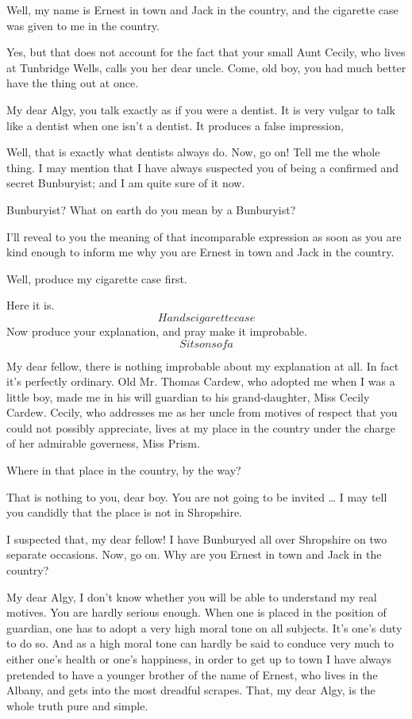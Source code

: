 \documentclass{book}
\begin{document}
\1  Well, my name is Ernest in town and Jack in the country, and
the cigarette case was given to me in the country.

\2  Yes, but that does not account for the fact that your
small Aunt Cecily, who lives at Tunbridge Wells, calls you her dear
uncle.  Come, old boy, you had much better have the thing out at
once.

\1  My dear Algy, you talk exactly as if you were a dentist.  It
is very vulgar to talk like a dentist when one isn't a dentist.  It
produces a false impression,

\2  Well, that is exactly what dentists always do.  Now, go
on!  Tell me the whole thing.  I may mention that I have always
suspected you of being a confirmed and secret Bunburyist; and I am
quite sure of it now.

\1  Bunburyist? What on earth do you mean by a Bunburyist?

\2  I'll reveal to you the meaning of that incomparable
expression as soon as you are kind enough to inform me why you are
Ernest in town and Jack in the country.

\1  Well, produce my cigarette case first.

\2  Here it is.  \[Hands cigarette case\]  Now produce your
explanation, and pray make it improbable.  \[Sits on sofa\]

\1  My dear fellow, there is nothing improbable about my
explanation at all.  In fact it's perfectly ordinary.  Old Mr.
Thomas Cardew, who adopted me when I was a little boy, made me in
his will guardian to his grand-daughter, Miss Cecily Cardew.
Cecily, who addresses me as her uncle from motives of respect that
you could not possibly appreciate, lives at my place in the country
under the charge of her admirable governess, Miss Prism.

\2  Where in that place in the country, by the way?

\1  That is nothing to you, dear boy.  You are not going to be
invited \ldots{} I may tell you candidly that the place is not in
Shropshire.

\2  I suspected that, my dear fellow!  I have Bunburyed all
over Shropshire on two separate occasions.  Now, go on.  Why are
you Ernest in town and Jack in the country?

\1  My dear Algy, I don't know whether you will be able to
understand my real motives.  You are hardly serious enough.  When
one is placed in the position of guardian, one has to adopt a very
high moral tone on all subjects.  It's one's duty to do so.  And as
a high moral tone can hardly be said to conduce very much to either
one's health or one's happiness, in order to get up to town I have
always pretended to have a younger brother of the name of Ernest,
who lives in the Albany, and gets into the most dreadful scrapes.
That, my dear Algy, is the whole truth pure and simple.
\end{document}
